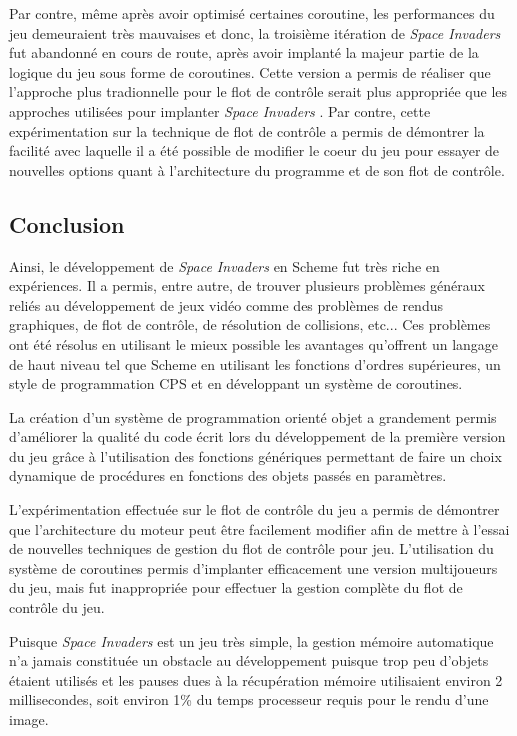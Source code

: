 \documentclass[12pt,oneside,letterpaper,francais]{book}
\newcommand{\si}{{\textit{Space Invaders }}}
\begin{document}
Par contre, même après avoir optimisé certaines coroutine, les
performances du jeu demeuraient très mauvaises et donc, la troisième
itération de \si fut abandonné en cours de route, après avoir implanté
la majeur partie de la logique du jeu sous forme de coroutines. Cette
version a permis de réaliser que l'approche plus tradionnelle pour le
flot de contrôle serait plus appropriée que les approches utilisées
pour implanter \si. Par contre, cette expérimentation sur la technique
de flot de contrôle a permis de démontrer la facilité avec laquelle il
a été possible de modifier le coeur du jeu pour essayer de nouvelles
options quant à l'architecture du programme et de son flot de
contrôle.

\subsection{Conclusion}

Ainsi, le développement de \si en Scheme fut très riche en
expériences. Il a permis, entre autre, de trouver plusieurs problèmes
généraux reliés au développement de jeux vidéo comme des problèmes de
rendus graphiques, de flot de contrôle, de résolution de collisions,
etc... Ces problèmes ont été résolus en utilisant le mieux possible
les avantages qu'offrent un langage de haut niveau tel que Scheme en
utilisant les fonctions d'ordres supérieures, un style de
programmation CPS et en développant un système de coroutines.

La création d'un système de programmation orienté objet a grandement
permis d'améliorer la qualité du code écrit lors du développement de
la première version du jeu grâce à l'utilisation des fonctions
génériques permettant de faire un choix dynamique de procédures en
fonctions des objets passés en paramètres.

L'expérimentation effectuée sur le flot de contrôle du jeu a permis de
démontrer que l'architecture du moteur peut être facilement modifier
afin de mettre à l'essai de nouvelles techniques de gestion du flot de
contrôle pour jeu. L'utilisation du système de coroutines permis
d'implanter efficacement une version multijoueurs du jeu, mais fut
inappropriée pour effectuer la gestion complète du flot de contrôle du
jeu.

Puisque \si est un jeu très simple, la gestion mémoire automatique n'a
jamais constituée un obstacle au développement puisque trop peu
d'objets étaient utilisés et les pauses dues à la récupération mémoire
utilisaient environ 2 millisecondes, soit environ 1\% du temps
processeur requis pour le rendu d'une image.
\end{document}
